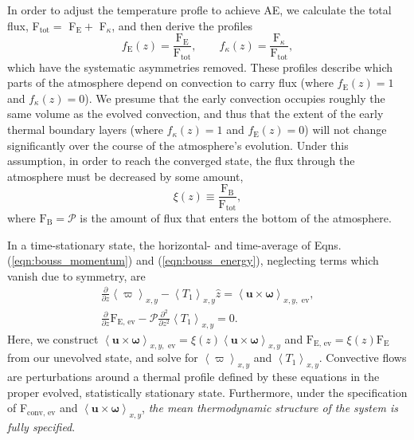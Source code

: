 \documentclass[aps, pre, onecolumn, nofootinbib, notitlepage, groupedaddress, amsfonts, amssymb, amsmath, longbibliography]{revtex4-1}
\newcommand{\angles}[1]{\ensuremath{\left\langle #1 \right\rangle}}
\begin{document}
In order to adjust the temperature profle to achieve AE, we calculate the total flux,
F$_{\text{tot}} =$ F$_{\text{E}} +$ F$_{\kappa}$, and then derive the profiles
\begin{equation}
f_{\text{E}}(z) = \frac{\text{F}_{\text{E}}}{\text{F}_{\text{tot}}},\qquad
f_{\kappa}(z) = \frac{\text{F}_{\kappa}}{\text{F}_{\text{tot}}},
\label{eqn:bvp_ratios}
\end{equation}
which have the systematic asymmetries removed. These profiles describe which
parts of the atmosphere depend on convection to carry flux (where $f_{\text{E}}(z) = 1$
and $f_{\kappa}(z) = 0$).
We presume that the early convection occupies roughly the same volume as the evolved
convection, and thus that the extent of the early thermal boundary layers 
(where $f_{\kappa}(z) = 1$ and $f_{\text{E}}(z) = 0$) 
will not change significantly over the course of the atmosphere's evolution.
Under this assumption, in order to reach the converged state, 
the flux through the atmosphere must be decreased by some amount,
\begin{equation}
\xi(z) \equiv \frac{\text{F}_{\text{B}}}{\text{F}_{\text{tot}}},
\label{eqn:xi}
\end{equation}
where $\text{F}_{\text{B}} = \mathcal{P}$ is the amount of flux that enters the
bottom of the atmosphere.

In a time-stationary state, the horizontal- and time-average of
Eqns. (\ref{eqn:bouss_momentum}) and (\ref{eqn:bouss_energy}), neglecting terms which
vanish due to symmetry, are
\begin{gather}
\frac{\partial}{\partial z}\angles{\varpi}_{x,y} - \angles{T_1}_{x,y}\hat{z} = \angles{\bm{u}\times\bm{\omega}}_{x,y, \text{ ev}},
	\label{eqn:bouss_BVP_momentum}
\\
\frac{\partial}{\partial z}\text{F}_{\text{E, ev}} - \mathcal{P}\frac{\partial^2}{\partial z^2} \angles{T_1}_{x,y} = 0.
	\label{eqn:bouss_BVP_energy}
\end{gather}
Here, we construct $\angles{\bm{u}\times\bm{\omega}}_{x, y,\text{ ev}} =
\xi(z) \angles{\bm{u}\times\bm{\omega}}_{x, y}$ and $\text{F}_{\text{E, ev}} = \xi(z) \text{F}_{\text{E}}$
from our unevolved state, and solve for $\angles{\varpi}_{x,y}$ and $\angles{T_1}_{x,y}$.
Convective flows
are perturbations around a thermal profile defined by these equations in the proper evolved, 
statistically stationary state. Furthermore, under the specification of
F$_{\text{conv, ev}}$ and $\angles{\bm{u}\times\bm{\omega}}_{x,y}$,
\emph{the mean thermodynamic structure of the system is fully specified}.
\end{document}

